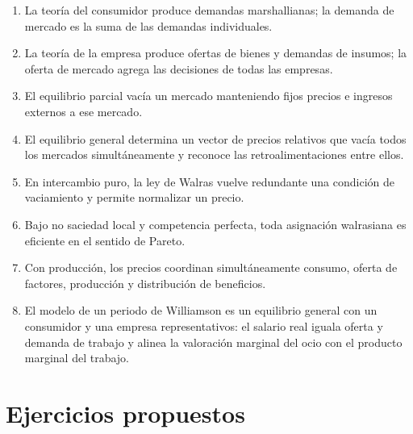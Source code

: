 \documentclass[12pt]{article}
\theoremstyle{cideplain}
\theoremstyle{cidedef}
\begin{document}
\begin{enumerate}
  \item La teoría del consumidor produce demandas marshallianas; la demanda de mercado
  es la suma de las demandas individuales.
  \item La teoría de la empresa produce ofertas de bienes y demandas de insumos; la oferta
  de mercado agrega las decisiones de todas las empresas.
  \item El equilibrio parcial vacía un mercado manteniendo fijos precios e ingresos externos
  a ese mercado.
  \item El equilibrio general determina un vector de precios relativos que vacía todos los
  mercados simultáneamente y reconoce las retroalimentaciones entre ellos.
  \item En intercambio puro, la ley de Walras vuelve redundante una condición de
  vaciamiento y permite normalizar un precio.
  \item Bajo no saciedad local y competencia perfecta, toda asignación walrasiana es
  eficiente en el sentido de Pareto.
  \item Con producción, los precios coordinan simultáneamente consumo, oferta de factores,
  producción y distribución de beneficios.
  \item El modelo de un periodo de Williamson es un equilibrio general con un consumidor
  y una empresa representativos: el salario real iguala oferta y demanda de trabajo y alinea
  la valoración marginal del ocio con el producto marginal del trabajo.
\end{enumerate}

\section{Ejercicios propuestos}
\end{document}
